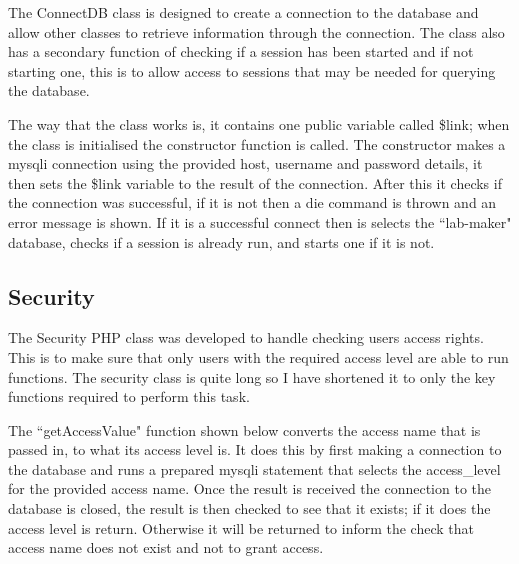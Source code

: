 \documentclass[11pt]{report}
\makeatletter
\newcommand{\phplisting}{\lstset{
  language        = php,
  basicstyle      = \tiny\ttfamily,
  numberstyle     = \tiny,
  keywordstyle    = \color{blue},
  stringstyle     = \color{red},
  identifierstyle = \color{black},
  commentstyle    = \color{gray},
  emph            =[1]{php},
  emphstyle       =[1]\color{darkgray},
  emph            =[2]{if,and,or,else},
  emphstyle       =[2]\color{darkgray},
  numbers = left,
  backgroundcolor=\color{lightgray},
  frame = single, 
  framexleftmargin=3em,
  xleftmargin=3em,
  breaklines= true,
  showstringspaces=false,
  escapeinside={(*@}{@*)}
  }}
\makeatother
\begin{document}
The ConnectDB class is designed to create a connection to the database and allow other classes to retrieve information through the connection. The class also has a secondary function of checking if a session has been started and if not starting one, this is to allow access to sessions that may be needed for querying the database. 






\noindent The way that the class works is, it contains one public variable called \$link; when the class is initialised the constructor function is called. The constructor makes a mysqli connection using the provided host, username and password details, it then sets the \$link variable to the result of the connection. After this it checks if the connection was successful, if it is not then a die command is thrown and an error message is shown. If it is a successful connect then is selects the ``lab-maker" database, checks if a session is already run, and starts one if it is not.

\subsection{Security}
\label{sec:security}

The Security PHP class was developed to handle checking users access rights. This is to make sure that only users with the required access level are able to run functions. The security class is quite long so I have shortened it to only the key functions required to perform this task.

\noindent The ``getAccessValue" function shown below converts the access name that is passed in, to what its access level is. It does this by first making a connection to the database and runs a prepared mysqli statement that selects the access\_level for the provided access name. Once the result is received the connection to the database is closed, the result is then checked to see that it exists; if it does the access level is return. Otherwise it will be returned to inform the check that access name does not exist and not to grant access.
\end{document}
